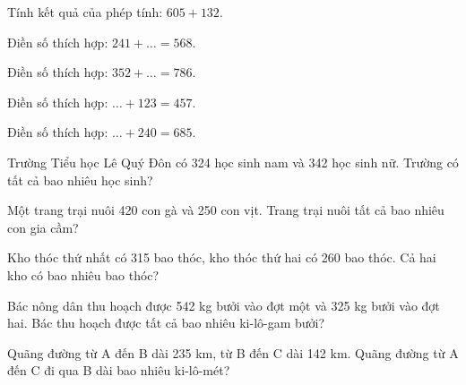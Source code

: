 \begin{ex}
Tính kết quả của phép tính: $605 + 132$.
\end{ex}

\begin{ex}
Điền số thích hợp: $241 + \dots = 568$.
\end{ex}

\begin{ex}
Điền số thích hợp: $352 + \dots = 786$.
\end{ex}

\begin{ex}
Điền số thích hợp: $\dots + 123 = 457$.
\end{ex}

\begin{ex}
Điền số thích hợp: $\dots + 240 = 685$.
\end{ex}

\begin{ex}
Trường Tiểu học Lê Quý Đôn có 324 học sinh nam và 342 học sinh nữ. Trường có tất cả bao nhiêu học sinh?
\end{ex}

\begin{ex}
Một trang trại nuôi 420 con gà và 250 con vịt. Trang trại nuôi tất cả bao nhiêu con gia cầm?
\end{ex}

\begin{ex}
Kho thóc thứ nhất có 315 bao thóc, kho thóc thứ hai có 260 bao thóc. Cả hai kho có bao nhiêu bao thóc?
\end{ex}

\begin{ex}
Bác nông dân thu hoạch được 542 kg bưởi vào đợt một và 325 kg bưởi vào đợt hai. Bác thu hoạch được tất cả bao nhiêu ki-lô-gam bưởi?
\end{ex}

\begin{ex}
Quãng đường từ A đến B dài 235 km, từ B đến C dài 142 km. Quãng đường từ A đến C đi qua B dài bao nhiêu ki-lô-mét?
\end{ex}


